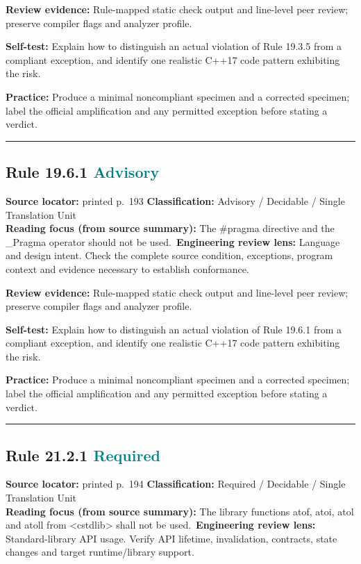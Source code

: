 \documentclass[10pt,letterpaper]{article}
\begin{document}
\textbf{Review evidence:} Rule-mapped static check output and line-level peer review; preserve compiler flags and analyzer profile.

\textbf{Self-test:} Explain how to distinguish an actual violation of Rule 19.3.5 from a compliant exception, and identify one realistic C++17 code pattern exhibiting the risk.\par
\textbf{Practice:} Produce a minimal noncompliant specimen and a corrected specimen; label the official amplification and any permitted exception before stating a verdict.
\smallskip\hrule\smallskip
\subsection*{Rule 19.6.1 \enspace \texorpdfstring{\small\textcolor{teal}{Advisory}}{Advisory}}
\noindent\textbf{Source locator:} printed p.~193 \quad\textbf{Classification:} Advisory / Decidable / Single Translation Unit\\
\textbf{Reading focus (from source summary):} The \#pragma directive and the \_Pragma operator should not be used.\
\textbf{Engineering review lens:} Language and design intent. Check the complete source condition, exceptions, program context and evidence necessary to establish conformance.

\textbf{Review evidence:} Rule-mapped static check output and line-level peer review; preserve compiler flags and analyzer profile.

\textbf{Self-test:} Explain how to distinguish an actual violation of Rule 19.6.1 from a compliant exception, and identify one realistic C++17 code pattern exhibiting the risk.\par
\textbf{Practice:} Produce a minimal noncompliant specimen and a corrected specimen; label the official amplification and any permitted exception before stating a verdict.
\smallskip\hrule\smallskip
\subsection*{Rule 21.2.1 \enspace \texorpdfstring{\small\textcolor{teal}{Required}}{Required}}
\noindent\textbf{Source locator:} printed p.~194 \quad\textbf{Classification:} Required / Decidable / Single Translation Unit\\
\textbf{Reading focus (from source summary):} The library functions atof, atoi, atol and atoll from \textless{}cstdlib\textgreater{} shall not be used.\
\textbf{Engineering review lens:} Standard-library API usage. Verify API lifetime, invalidation, contracts, state changes and target runtime/library support.
\end{document}
